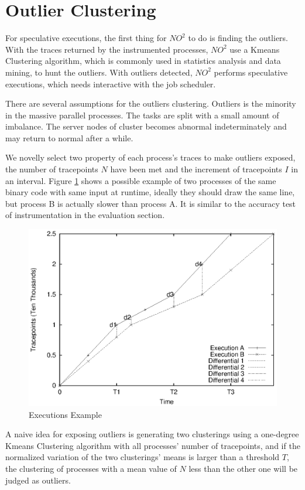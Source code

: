 \section{Outlier Clustering}

For speculative executions, the first thing for $NO^2$ to do is finding the outliers. With the traces returned by the instrumented processes, $NO^2$ use a Kmeans Clustering algorithm, which is commonly used in statistics analysis and data mining, to hunt the outliers. With outliers detected, $NO^2$ performs speculative executions, which needs interactive with the job scheduler.

There are several assumptions for the outliers clustering. Outliers is the minority in the massive parallel processes. The tasks are split with a small amount of imbalance. The server nodes of cluster becomes abnormal indeterminately and may return to normal after a while.

We novelly select two property of each process's traces to make outliers exposed, the number of tracepoints $N$ have been met and the increment of tracepoints $I$ in an interval. Figure \ref{figure:executionsexample} shows a possible example of two processes of the same binary code with same input at runtime, ideally they should draw the same line, but process B is actually slower than process A. It is similar to the accuracy test of instrumentation in the evaluation section.

\begin{figure}
\centering
\includegraphics[width=0.9\columnwidth]{figures/executions_example.eps}
\caption{Executions Example}
\label{figure:executionsexample}
\end{figure}

A naive idea for exposing outliers is generating two clusterings using a one-degree Kmeans Clustering algorithm with all processes' number of tracepoints, and if the normalized variation of the two clusterings' means is larger than a threshold $T$, the clustering of processes with a mean value of $N$ less than the other one will be judged as outliers.


